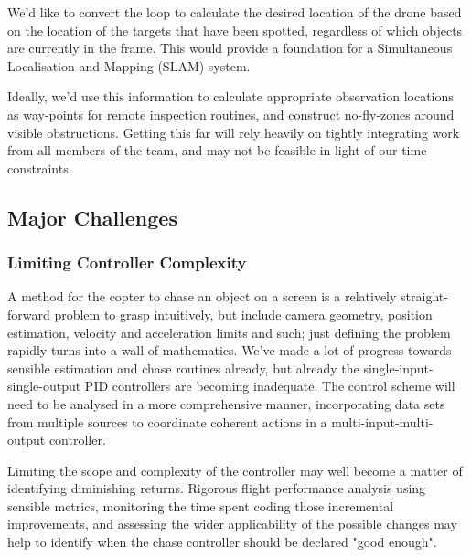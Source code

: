 \documentclass[a4paper, 11pt, titlepage]{article}
\begin{document}
      We'd like to convert the loop to calculate the desired location of the drone based on the location of the targets that have been spotted, regardless of which objects are currently in the frame.  This would provide a foundation for a Simultaneous Localisation and Mapping (SLAM) system.

      Ideally, we'd use this information to calculate appropriate observation locations as way-points for remote inspection routines, and construct no-fly-zones around visible obstructions.  Getting this far will rely heavily on tightly integrating work from all members of the team, and may not be feasible in light of our time constraints.

  \subsection{Major Challenges}
    \subsubsection{Limiting Controller Complexity}
      A method for the copter to chase an object on a screen is a relatively straight-forward problem to grasp intuitively, but include camera geometry, position estimation, velocity and acceleration limits and such; just defining the problem rapidly turns into a wall of mathematics.  We've made a lot of progress towards sensible estimation and chase routines already, but already the single-input-single-output PID controllers are becoming inadequate. The control scheme will need to be analysed in a more comprehensive manner, incorporating data sets from multiple sources to coordinate coherent actions in a multi-input-multi-output controller.

      Limiting the scope and complexity of the controller may well become a matter of identifying diminishing returns.  Rigorous flight performance analysis using sensible metrics, monitoring the time spent coding those incremental improvements, and assessing the wider applicability of the possible changes may help to identify when the chase controller should be declared "good enough".
\end{document}
